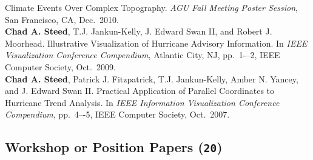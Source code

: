 \documentclass[11pt, letterpaper]{article}
\newcommand{\years}[1]{\marginnote{\scriptsize #1}}
\begin{document}
Climate Events Over Complex Topography. \emph{AGU Fall Meeting Poster Session},
San Francisco, CA, Dec.\ 2010.\\
\years{2009}\textbf{Chad A. Steed}, T.J. Jankun-Kelly, J. Edward Swan II, and
Robert J. Moorhead. Illustrative Visualization of Hurricane Advisory
Information. In \emph{IEEE Visualization Conference Compendium}, Atlantic City, NJ,
pp.\ 1-–2, IEEE Computer Society, Oct.\ 2009.\\
\years{2007}\textbf{Chad A. Steed}, Patrick J. Fitzpatrick, T.J. Jankun-Kelly,
Amber N. Yancey, and J. Edward Swan II.  Practical Application of Parallel
Coordinates to Hurricane Trend Analysis.  In \emph{IEEE Information Visualization
Conference Compendium}, pp.\ 4–-5, IEEE Computer Society, Oct.\ 2007.

\subsection*{Workshop or Position Papers (\texttt{20})}
\end{document}
